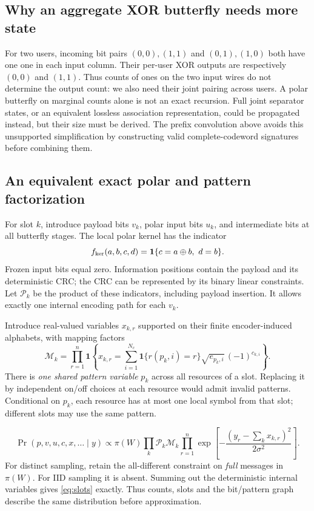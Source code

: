 \documentclass[10pt,a4paper]{article}
\newcommand{\ind}{\mathbf 1}
\begin{document}
\subsection{Why an aggregate XOR butterfly needs more state}
For two users, incoming bit pairs $(0,0),(1,1)$ and $(0,1),(1,0)$ both have one one in each input column.
Their per-user XOR outputs are respectively $(0,0)$ and $(1,1)$.
Thus counts of ones on the two input wires do not determine the output count: we also need their
joint pairing across users. A polar butterfly on marginal counts alone is not an exact recursion.
Full joint separator states, or an equivalent lossless association representation, could be propagated instead,
but their size must be derived. The prefix convolution above avoids this unsupported simplification by
constructing valid complete-codeword signatures before combining them.

\clearpage
\subsection{An equivalent exact polar and pattern factorization}\label{sec:bit-factorization}
For slot $k$, introduce payload bits $v_k$, polar input bits $u_k$, and intermediate bits at all butterfly stages.
The local polar kernel has the indicator
\begin{equation}
 f_{\rm ker}(a,b,c,d)=\ind\{c=a\oplus b,\ d=b\}.
\end{equation}
Frozen input bits equal zero. Information positions contain the payload and its deterministic CRC; the CRC can be
represented by its binary linear constraints. Let $\mathcal P_k$ be the product of these indicators, including
payload insertion. It allows exactly one internal encoding path for each $v_k$.

Introduce real-valued variables $x_{k,r}$ supported on their finite encoder-induced alphabets, with mapping factors
\begin{equation}
 \mathcal M_k=\prod_{r=1}^{n}
 \ind\!\left\{x_{k,r}=\sum_{i=1}^{N_c}
       \ind\{r(p_k,i)=r\}\sqrt{e_{p_k,i}}\,(-1)^{c_{k,i}}\right\}.
\end{equation}
There is \emph{one shared pattern variable} $p_k$ across all resources of a slot. Replacing it by independent on/off
choices at each resource would admit invalid patterns. Conditional on $p_k$, each resource has at most one local
symbol from that slot; different slots may use the same pattern.

\begin{equation}
 \Pr(p,v,u,c,x,\ldots\mid y)\propto
 \pi(W)\prod_k\mathcal P_k\mathcal M_k
 \prod_{r=1}^{n}\exp\!\left[-\frac{(y_r-\sum_kx_{k,r})^2}{2\sigma^2}\right].
 \label{eq:graph}
\end{equation}
For distinct sampling, retain the all-different constraint on \emph{full} messages in $\pi(W)$.
For IID sampling it is absent. Summing out the deterministic internal variables gives \eqref{eq:slots} exactly.
Thus counts, slots and the bit/pattern graph describe the same distribution before approximation.
\end{document}
